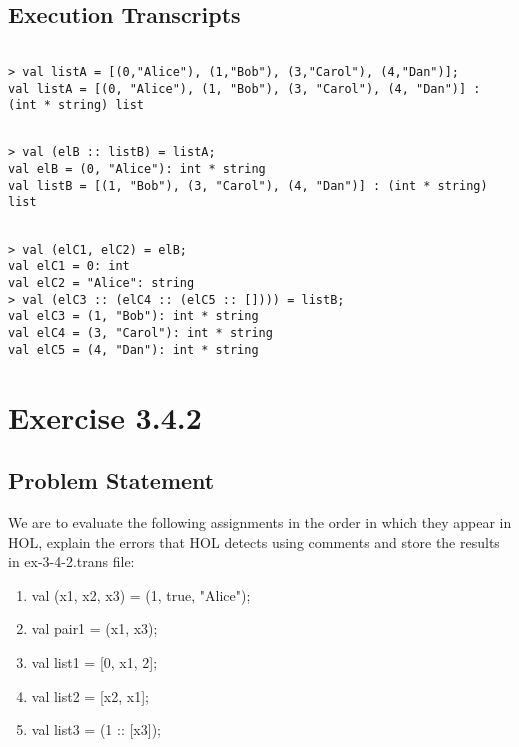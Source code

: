 \documentclass{report}
\begin{document}
\section{Execution Transcripts}
\label{sec:execution-transc-1}

\setcounter{sessioncount}{0}
\begin{session}
\begin{scriptsize}
\begin{verbatim}

> val listA = [(0,"Alice"), (1,"Bob"), (3,"Carol"), (4,"Dan")];
val listA = [(0, "Alice"), (1, "Bob"), (3, "Carol"), (4, "Dan")] : (int * string) list
\end{verbatim}
\end{scriptsize}
\end{session}

\begin{session}
\begin{scriptsize}
\begin{verbatim}

> val (elB :: listB) = listA;
val elB = (0, "Alice"): int * string
val listB = [(1, "Bob"), (3, "Carol"), (4, "Dan")] : (int * string) list
\end{verbatim}
\end{scriptsize}
\end{session}

\begin{session}
\begin{scriptsize}
\begin{verbatim}

> val (elC1, elC2) = elB;
val elC1 = 0: int
val elC2 = "Alice": string
> val (elC3 :: (elC4 :: (elC5 :: []))) = listB;
val elC3 = (1, "Bob"): int * string
val elC4 = (3, "Carol"): int * string
val elC5 = (4, "Dan"): int * string
\end{verbatim}
\end{scriptsize}
\end{session}

\chapter{Exercise 3.4.2}
\label{cha:exercise-3.4.2}

\section{Problem Statement}
\label{sec:problem-statement-2}

We are to evaluate the following assignments in the
order in which they appear in HOL, explain the errors that HOL
detects using comments and store the results in ex-3-4-2.trans file:\\
\begin{enumerate}[{1.}]
\item val (x1, x2, x3) = (1, true, "Alice");
\item val pair1 = (x1, x3);
\item val list1 = [0, x1, 2];
\item val list2 = [x2, x1];
\item val list3 = (1 :: [x3]);
\end{enumerate}
\end{document}
